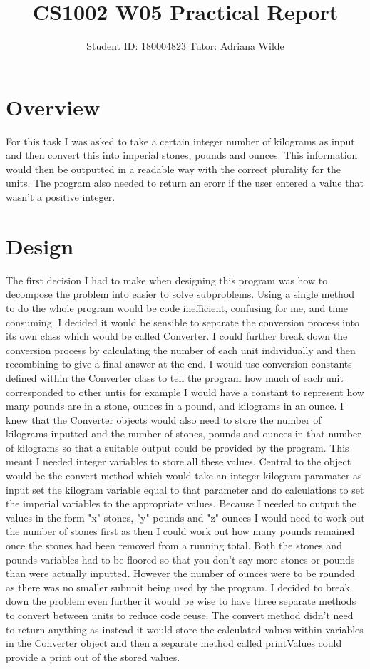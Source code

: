 \documentclass[a4paper]{article}
\title{CS1002 W05 Practical Report}
\author{Student ID: 180004823 Tutor: Adriana Wilde}
\begin{document}
\maketitle
\section*{Overview}
For this task I was asked to take a certain integer number of kilograms as input and then convert this into imperial stones, pounds and ounces. This 
information would then be outputted in a readable way with the correct plurality for the units. The program also needed to return an erorr if the user 
entered a value that wasn't a positive integer.
\section*{Design}
The first decision I had to make when designing this program was how to decompose the problem into easier to solve subproblems. Using a single method 
to do the whole program would be code inefficient, confusing for me, and time consuming. I decided it would be sensible to separate the conversion 
process into its own class which would be called Converter. I could further break down the conversion process by calculating the number of each unit 
individually and then recombining to give a final answer at the end. I would use conversion constants defined within the Converter class to tell the 
program how much of each unit corresponded to other untis for example I would have a constant to represent how many pounds are in a stone, ounces in a 
pound, and kilograms in an ounce. I knew that the Converter objects would also need to store the number of kilograms inputted and the number of 
stones, pounds and ounces in that number of kilograms so that a suitable output could be provided by the program. This meant I needed integer 
variables to store all these values. Central to the object would be the convert method which would take an integer kilogram paramater as input set the 
kilogram variable equal to that parameter and do calculations to set the imperial variables to the appropriate values. Because I needed to output the 
values in the form "x" stones, "y" pounds and "z" ounces I would need to work out the number of stones first as then I could work out how many pounds 
remained once the stones had been removed from a running total. Both the stones and pounds variables had to be floored so that you don't say more 
stones or pounds than were actually inputted. However the number of ounces were to be rounded as there was no smaller subunit being used by the 
program. I decided to break down the problem even further it would be wise to have three separate methods to convert between units to reduce code 
reuse. The convert method didn't need to return anything as instead it would store the calculated values within variables in the Converter object and 
then a separate method called printValues could provide a print out of the stored values.
\end{document}
